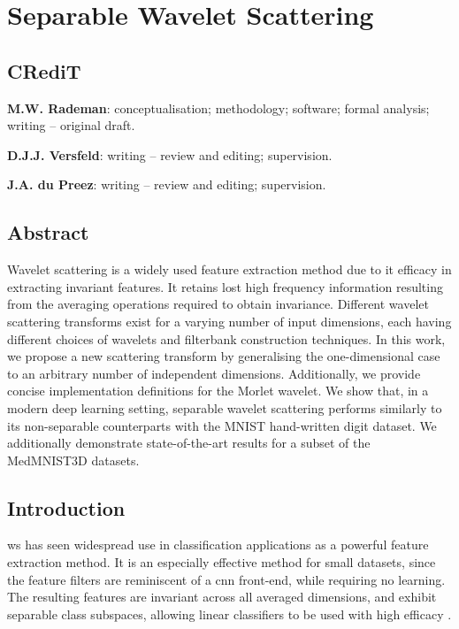\chapter{Separable Wavelet Scattering}
\label{chap:p3}





\section*{CRediT}
\textbf{M.W. Rademan}: conceptualisation; methodology; software; formal analysis; writing -- original draft.

\textbf{D.J.J. Versfeld}: writing -- review and editing; supervision.

\textbf{J.A. du Preez}: writing -- review and editing; supervision.

\section*{Abstract}
Wavelet scattering is a widely used feature extraction method due to it efficacy in extracting invariant features. It retains lost high frequency information resulting from the averaging operations required to obtain invariance. Different wavelet scattering transforms exist for a varying number of input dimensions, each having different choices of wavelets and filterbank construction techniques. In this work, we propose a new scattering transform by generalising the one-dimensional case to an arbitrary number of independent dimensions. Additionally, we provide concise implementation definitions for the Morlet wavelet. We show that, in a modern deep learning setting, separable wavelet scattering performs similarly to its non-separable counterparts with the MNIST hand-written digit dataset. We additionally demonstrate state-of-the-art results for a subset of the MedMNIST3D datasets.


\section{Introduction}
\Ac{ws} has seen widespread use in classification applications as a powerful feature extraction method. It is an especially effective method for small datasets, since the feature filters are reminiscent of a \ac{cnn} front-end, while requiring no learning. The resulting features are invariant across all averaged dimensions, and exhibit separable class subspaces, allowing linear classifiers to be used with high efficacy \cite{2dscattering}.

